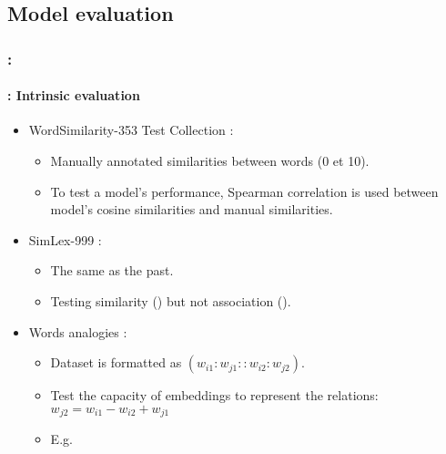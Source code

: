 \documentclass[xcolor=table]{beamer}
\begin{document}
\subsection{Model evaluation}

\begin{frame}
	\frametitle{\insertshortsubtitle: \insertsection}
	\framesubtitle{\insertsubsection: Intrinsic evaluation}

	\begin{itemize}
		\item  WordSimilarity-353 Test Collection \cite{2002-finkelstein-al}:
		\begin{itemize}
			\item Manually annotated similarities between words (0 et 10).
			\item To test a model's performance, Spearman correlation is used between model's cosine similarities and manual similarities.
		\end{itemize}
		
		\item SimLex-999 \cite{2015-hill-al}:
		\begin{itemize}
			\item The same as the past.
			\item Testing similarity () but not association ().
		\end{itemize}
	
		\item Words analogies \cite{2013-mikolov-al2}:
		\begin{itemize}
			\item Dataset is formatted as $(w_{i1}:w_{j1} :: w_{i2}:w_{j2})$.
			\item Test the capacity of embeddings to represent the relations: $w_{j2} = w_{i1} - w_{i2} + w_{j1}$
			\item E.g. 
		\end{itemize}
	
	\end{itemize}
	
\end{frame}
\end{document}

